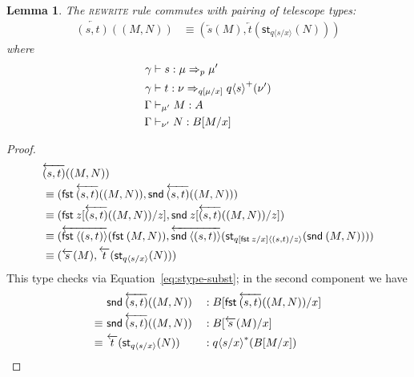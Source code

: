 \documentclass[10pt]{article}
\newtheorem{lemma}{Lemma}
\theoremstyle{definition}
\newcommand\dsd[1]{\ensuremath{\mathsf{#1}}}
\newcommand{\yields}{\vdash}
\newcommand{\tcell}{\Rightarrow}
\newcommand{\app}[2]{\ensuremath{#1 \: #2}}
\newcommand{\fst}[1]{\app{\dsd{fst}}{#1}}
\newcommand{\snd}[1]{\app{\dsd{snd}}{#1}}
\newcommand{\id}{\mathsf{id}}
\newcommand{\rewrite}[2]{\overleftarrow{#1}(#2)}
\newcommand\St[2]{\ensuremath{{#1}^*(#2)}}
\newcommand\StI[2]{\ensuremath{\mathsf{st}_{#1}(#2)}}
\newcommand\UnSt[2]{\ensuremath{\mathsf{unst}_{#1}(#2)}}
\newcommand\TermTwoT[5]{\ensuremath{#1 \vdash {#2} : #3 \tcell_{#5} #4}}
\newcommand\TrPlus[2]{\ensuremath{{#1}^+(#2)}}
\newcommand\ap[2]{\ensuremath{#1 \langle #2 \rangle }}
\begin{document}
\begin{lemma}
The \textsc{rewrite} rule commutes with pairing of telescope types:
\begin{align*}
\rewrite{(s, t)}{(M, N)} &\equiv (\rewrite{s}{M}, \rewrite{t}{\StI{\ap{q}{s/x}}{N}} ) 
\end{align*}
where
\begin{align*}
\TermTwoT{\gamma &}{s}{\mu}{\mu'}{p} \\
\TermTwoT{\gamma &}{t}{\nu}{\TrPlus{\ap{q}{s}}{\nu'}}{q[\mu/x]} \\
\Gamma &\yields_{\mu'} M : A \\
\Gamma &\yields_{\nu'} N : B[M/x]
\end{align*}
\end{lemma}
\begin{proof}
\begin{align*}
&\rewrite{(s, t)}{(M, N)} \\
&\equiv (\fst\rewrite{(s, t)}{(M, N)}, \snd \rewrite{(s, t)}{(M, N)} ) \\
&\equiv (\fst z [\rewrite{(s, t)}{(M, N)}/z], \snd z [\rewrite{(s, t)}{(M, N)}/z] ) \\
&\equiv (\rewrite{\ap{\fst}{(s, t)}}{\fst (M, N)}, \rewrite{\ap{\snd}{(s, t)}}{\StI{\ap{q[\fst z/x]}{(s, t)/z}}{\snd (M, N)}} ) \\
&\equiv (\rewrite{s}{M}, \rewrite{t}{\StI{\ap{q}{s/x}}{N}} )
\end{align*}
This type checks via Equation~\eqref{eq:stype-subst}; in the second component we have
\begin{align*}
&\snd \rewrite{(s, t)}{(M, N)} &&: B[\fst\rewrite{(s, t)}{(M, N)}/x] \\
\equiv~&\snd \rewrite{(s, t)}{(M, N)} &&: B[\rewrite{s}{M}/x] \\
\equiv~&\rewrite{t}{\StI{\ap{q}{s/x}}{N}} &&: \St{\ap{q}{s/x}}{B[M/x]}
\end{align*}
\end{proof}
\end{document}
